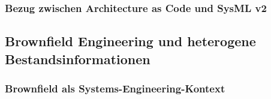 \subsubsection{Bezug zwischen Architecture as Code und SysML v2}
\label{sec:aac_sysml}

%
%
%
%
%
%
%


\subsection{Brownfield Engineering und heterogene Bestandsinformationen}
\label{sec:brownfield}

\subsubsection{Brownfield als Systems-Engineering-Kontext}
\label{sec:brownfield_context}

%
%
%
%
%
%
%


